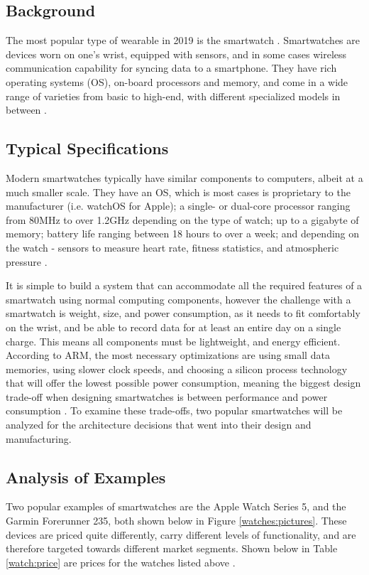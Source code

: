 \subsection{Background}
The most popular type of wearable in 2019 is the smartwatch \cite{best_watches}. 
Smartwatches are devices worn on one's wrist, equipped with sensors, and in some 
cases wireless communication capability for syncing data to a smartphone. They have
rich operating systems (OS), on-board processors and memory, and come in a wide range
of varieties from basic to high-end, with different specialized models in between \cite{smartwatch_arch_rit}.

\subsection{Typical Specifications}
Modern smartwatches typically have similar components to computers, albeit at a much smaller scale.
They have an OS, which is most cases is proprietary to the manufacturer (i.e. watchOS for Apple);
a single- or dual-core processor ranging from 80MHz to over 1.2GHz depending on the type of watch;
up to a gigabyte of memory; battery life ranging between 18 hours to over a week; and depending on 
the watch - sensors to measure heart rate, fitness statistics, 
and atmospheric pressure \cite{smartwatch_arch_rit}.

It is simple to build a system that can accommodate all the required features of a smartwatch
using normal computing components, however the challenge with a smartwatch is weight, size, and power
consumption, as it needs to fit comfortably on the wrist, and be able to record data for at least
an entire day on a single charge. This means all components must be lightweight, and energy efficient.
According to ARM, the most necessary optimizations are using small data memories, using slower clock
speeds, and choosing a silicon process technology that will offer the lowest possible power consumption,
meaning the biggest design trade-off when designing smartwatches is between performance and 
power consumption \cite{arm_wearable}. To examine these trade-offs, two popular smartwatches will be
analyzed for the architecture decisions that went into their design and manufacturing.

\subsection{Analysis of Examples}
Two popular examples of smartwatches are the Apple Watch Series 5,
and the Garmin Forerunner 235, both shown below in Figure \ref{watches:pictures}.
These devices are priced quite differently, carry different levels of functionality, and are
therefore targeted towards different market segments. Shown below in Table \ref{watch:price} are 
prices for the watches listed above \cite{apple_price} \cite{garmin_price}.

